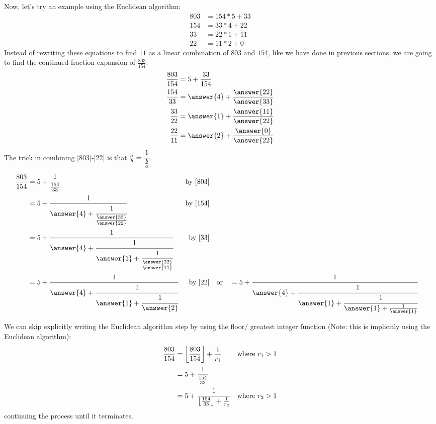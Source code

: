 \documentclass{ximera}
\begin{document}
\begin{example}
 Now, let's try an example using the Euclidean algorithm:
\begin{align*}
 803&=154*5+33\\
 154&=33*4+22\\
 33&=22*1+11\\
 22&=11*2+0
\end{align*}
Instead of rewriting these equations to find $11$ as a linear combination of $803$ and $154$, like we have done in previous sections, we are going to find the continued fraction expansion of $\frac{803}{154}$.
\begin{align}
 \frac{803}{154}&=5+\frac{33}{154}\label{803}\\
 \frac{154}{33}&=\answer{4}+\frac{\answer{22}}{\answer{33}\label{154}}\\
 \frac{33}{22}&=\answer{1}+\frac{\answer{11}}{\answer{22}}\label{33}\\
 \frac{22}{11}&=\answer{2}+\frac{\answer{0}}{\answer{22}}\label{22}
\end{align}
The trick in combining \eqref{803}-\eqref{22} is that $\frac{a}{b}=\cfrac{1}{\frac{b}{a}}$.
\begin{align*}
  \frac{803}{154}&=5+\cfrac{1}{\frac{154}{33}}& \textrm{by }\eqref{803}\\
  &=5+\cfrac{1}{\answer{4}+\cfrac{1}{\frac{\answer{33}}{\answer{22}}}}& \textrm{by }\eqref{154}\\
  &=5+\cfrac{1}{\answer{4}+\cfrac{1}{\answer{1}+\cfrac{1}{\frac{\answer{22}}{\answer{11}}}}}& \textrm{by }\eqref{33}\\ &=5+\cfrac{1}{\answer{4}+\cfrac{1}{\answer{1}+\cfrac{1}{\answer{2}}}}& \textrm{by }\eqref{22} &\quad \textrm{or} \quad
  =5+\cfrac{1}{\answer{4}+\cfrac{1}{\answer{1}+\cfrac{1}{\answer{1}+\frac{1}{\answer{1}}}}}
\end{align*}

We can skip explicitly writing the Euclidean algorithm step by using the floor/ greatest integer function (Note: this is implicitly using the Euclidean algorithm):
\begin{align*}
 \frac{803}{154}&=\left\lfloor\frac{803}{154}\right\rfloor+\frac{1}{r_1} &\textrm{where } r_1>1\\
 &=5+\cfrac{1}{\frac{154}{33}}\\
 &=5+\cfrac{1}{\left\lfloor\frac{154}{33}\right\rfloor+\frac{1}{r_2}}&\textrm{where } r_2>1\\
\end{align*}
continuing the process until it terminates. 
\end{example}
\end{document}
